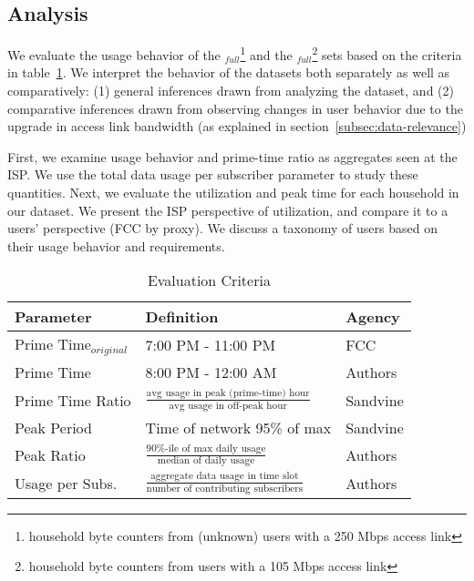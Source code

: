 \subsection{Analysis}
\label{subsec:results}

We evaluate the usage behavior of the \test$_{full}$\footnote{household byte counters
from (unknown) users with a 250 Mbps access link}  and the \control$_{full}$\footnote{household
byte counters from users with a 105 Mbps access link} sets based
on the criteria in table~\ref{tab:eval-criteria}. We interpret the behavior of the datasets
both separately as well as comparatively: (1) general inferences drawn from analyzing the dataset,
and (2) comparative inferences drawn from observing changes in user behavior due to the upgrade
in access link bandwidth (as explained in section~\ref{subsec:data-relevance})

First, we examine usage behavior and prime-time ratio as aggregates seen at the ISP. We use 
the total data usage per subscriber parameter to study these quantities. Next, we
evaluate the utilization and peak time for each household in our dataset. We present the ISP
perspective of utilization, and compare it to a users' perspective (FCC by proxy). We discuss
a taxonomy of users based on their usage behavior and requirements. %


\begin{table}[ht!]
\small 
\begin{tabular}{|l|l|l|}
\hline
\textbf{Parameter}				& \textbf{Definition}				& \textbf{Agency}  \\ \hline
Prime Time$_{original}$			& 7:00 PM - 11:00 PM				& FCC       \\
Prime Time       				& 8:00 PM - 12:00 AM                & Authors       \\
Prime Time Ratio 				& \( \frac{ \text{avg usage in peak (prime-time) hour}}{ \text{avg usage in off-peak hour}}\) 												& Sandvine  \\
Peak Period						& Time of network 95\% of max      	& Sandvine \\
Peak Ratio       				& \(\frac{\text{90\%-ile of max daily usage}}{\text{median of daily usage}}\)                											& Authors \\
Usage per Subs.       			& \(\frac{\text{aggregate data usage in time slot}}{\text{number of contributing subscribers}}\)                											& Authors \\ \hline
\end{tabular}
\caption{Evaluation Criteria}
\label{tab:eval-criteria}
\end{table}





%